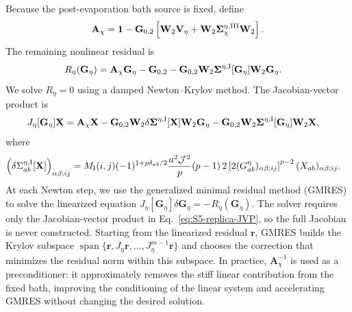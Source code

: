 \documentclass[11pt,a4paper]{article}
\begin{document}
Because the post-evaporation bath source is fixed, define
\begin{equation}
  \mathbf A_\chi
  =
  \mathbf 1
  -
  \mathbf G_{0,2}
  \left[
  \mathbf W_2\mathbf V_\eta
  +
  \mathbf W_2
  \boldsymbol\Sigma^{\eta,\rm III}_{\chi}
  \mathbf W_2
  \right].
\label{eq:S5-fixed-bath-operator}
\end{equation}
The remaining nonlinear residual is
\begin{equation}
\begin{aligned}
  R_\eta(\mathbf G_\eta)
  &=
  \mathbf A_\chi\mathbf G_\eta
  -
  \mathbf G_{0,2}
  -
  \mathbf G_{0,2}
  \mathbf W_2
  \boldsymbol\Sigma^{\eta,\rm I}[\mathbf G_\eta]
  \mathbf W_2
  \mathbf G_\eta .
\end{aligned}
\label{eq:S5-replica-residual}
\end{equation}
We solve \(R_\eta=0\) using a damped Newton--Krylov method. The
Jacobian-vector product is
\begin{equation}
\begin{aligned}
  J_\eta[\mathbf G_\eta]\mathbf X
  &=
  \mathbf A_\chi\mathbf X
  -
  \mathbf G_{0,2}\mathbf W_2
  \delta\boldsymbol\Sigma^{\eta,\rm I}[\mathbf X]
  \mathbf W_2\mathbf G_\eta
  -
  \mathbf G_{0,2}\mathbf W_2
  \boldsymbol\Sigma^{\eta,\rm I}[\mathbf G_\eta]
  \mathbf W_2\mathbf X ,
\end{aligned}
\label{eq:S5-replica-JVP}
\end{equation}
where
\begin{equation}
\begin{aligned}
  \left(
  \delta\Sigma^{\eta,\rm I}_{ab}[\mathbf X]
  \right)_{\alpha\beta;ij}
  &=
  M_{\rm I}(i,j)
  (-1)^{1+p\delta_{ab}/2}
  \frac{a^2\mathcal J^2}{p}
  (p-1)\,2
  \left[
  2(G^\eta_{ab})_{\alpha\beta;ij}
  \right]^{p-2}
  (X_{ab})_{\alpha\beta;ij}.
\end{aligned}
\label{eq:S5-replica-delta-sigma}
\end{equation}
At each Newton step, we use the generalized minimal residual method (GMRES) to solve the linearized equation
\(J_\eta[\mathbf G_\eta]\delta\mathbf G_\eta
=-R_\eta(\mathbf G_\eta)\). The solver requires only the Jacobian-vector
product in Eq.~\eqref{eq:S5-replica-JVP}, so the full Jacobian is never
constructed. Starting from the linearized residual \(\mathbf r\), GMRES
builds the Krylov subspace
\(\operatorname{span}\{\mathbf r,J_\eta\mathbf r,\ldots,
J_\eta^{m-1}\mathbf r\}\) and chooses the correction that minimizes the
residual norm within this subspace. In practice, \(\mathbf A_\chi^{-1}\) is used as a preconditioner: it
approximately removes the stiff linear contribution from the fixed bath,
improving the conditioning of the linear system and accelerating GMRES
without changing the desired solution.
\end{document}
